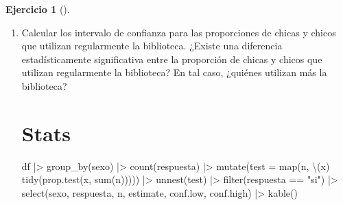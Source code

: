 \documentclass[
  a4paper,
]{scrreport}
\newenvironment{Shaded}{\begin{snugshade}}{\end{snugshade}}
\newcommand{\AttributeTok}[1]{\textcolor[rgb]{0.40,0.45,0.13}{#1}}
\newcommand{\ExtensionTok}[1]{\textcolor[rgb]{0.00,0.23,0.31}{#1}}
\newcommand{\FunctionTok}[1]{\textcolor[rgb]{0.28,0.35,0.67}{#1}}
\newcommand{\NormalTok}[1]{\textcolor[rgb]{0.00,0.23,0.31}{#1}}
\newcommand{\SpecialCharTok}[1]{\textcolor[rgb]{0.37,0.37,0.37}{#1}}
\newcommand{\StringTok}[1]{\textcolor[rgb]{0.13,0.47,0.30}{#1}}
\theoremstyle{definition}
\newtheorem{exercise}{Ejercicio}[chapter]
\theoremstyle{remark}
\begin{document}
\begin{exercise}[]
\begin{enumerate}
\begin{tcolorbox}
\begin{Shaded}
\begin{Highlighting}[]
\ExtensionTok{Calcula}\NormalTok{ el intervalo del 99\% de confianza para la proporción de alumnos que utilizan la biblioteca.}
\end{Highlighting}
\end{Shaded}

  Se trata de un intervalo poco preciso, ya que su amplitud es bastante
  grande.

  \end{tcolorbox}
\item
  Calcular los intervalo de confianza para las proporciones de chicas y
  chicos que utilizan regularmente la biblioteca. ¿Existe una diferencia
  estadísticamente significativa entre la proporción de chicas y chicos
  que utilizan regularmente la biblioteca? En tal caso, ¿quiénes
  utilizan más la biblioteca?

  \begin{tcolorbox}[enhanced jigsaw, colframe=quarto-callout-tip-color-frame, toprule=.15mm, bottomtitle=1mm, breakable, opacitybacktitle=0.6, toptitle=1mm, colback=white, bottomrule=.15mm, title=\textcolor{quarto-callout-tip-color}{\faLightbulb}\hspace{0.5em}{Solución}, arc=.35mm, left=2mm, titlerule=0mm, rightrule=.15mm, coltitle=black, leftrule=.75mm, opacityback=0, colbacktitle=quarto-callout-tip-color!10!white]

  \section{Stats}

\begin{Shaded}
\begin{Highlighting}[]
\NormalTok{df }\SpecialCharTok{|\textgreater{}} 
    \FunctionTok{group\_by}\NormalTok{(sexo) }\SpecialCharTok{|\textgreater{}} 
    \FunctionTok{count}\NormalTok{(respuesta) }\SpecialCharTok{|\textgreater{}} 
    \FunctionTok{mutate}\NormalTok{(}\AttributeTok{test =} \FunctionTok{map}\NormalTok{(n, \textbackslash{}(x) }\FunctionTok{tidy}\NormalTok{(}\FunctionTok{prop.test}\NormalTok{(x, }\FunctionTok{sum}\NormalTok{(n))))) }\SpecialCharTok{|\textgreater{}}     
    \FunctionTok{unnest}\NormalTok{(test) }\SpecialCharTok{|\textgreater{}}
    \FunctionTok{filter}\NormalTok{(respuesta }\SpecialCharTok{==} \StringTok{"si"}\NormalTok{) }\SpecialCharTok{|\textgreater{}} 
    \FunctionTok{select}\NormalTok{(sexo, respuesta, n, estimate, conf.low, conf.high) }\SpecialCharTok{|\textgreater{}}  
    \FunctionTok{kable}\NormalTok{() }
\end{Highlighting}
\end{Shaded}


\end{tcolorbox}
\end{enumerate}
\end{exercise}
\end{document}

